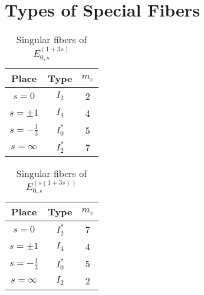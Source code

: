 \documentclass[main]{subfiles}
\begin{document}
\chapter{Types of Special Fibers}

\begin{table}[h]
    \centering
    \caption{Singular fibers of $E_{0,s}^{(1 + 3s)}$}
    \begin{tabular}{|c|c|c|}
        \hline
        Place            & Type    & $m_v$ \\
        \hline
        $s=0$            & $I_2$   & 2     \\
        $s=\pm 1$        & $I_4$   & 4     \\
        $s=-\frac{1}{3}$ & $I_0^*$ & 5     \\
        $s=\infty$       & $I_2^*$ & 7     \\
        \hline
    \end{tabular}
\end{table}

\begin{table}[h]
    \centering
    \caption{Singular fibers of $E_{0,s}^{(s(1 + 3s))}$}
    \begin{tabular}{|c|c|c|}
        \hline
        Place            & Type    & $m_v$ \\
        \hline
        $s=0$            & $I_2^*$ & 7     \\
        $s=\pm 1$        & $I_4$   & 4     \\
        $s=-\frac{1}{3}$ & $I_0^*$ & 5     \\
        $s=\infty$       & $I_2$   & 2     \\
        \hline
    \end{tabular}
\end{table}
\end{document}
